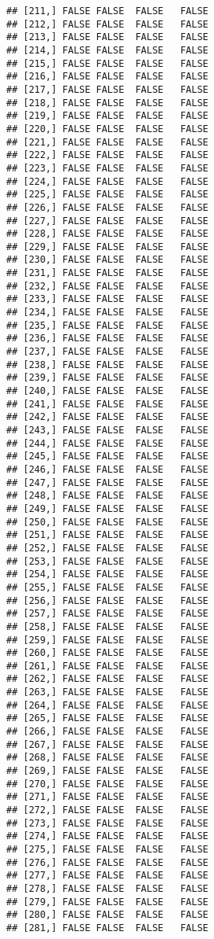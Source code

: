 \documentclass[
]{article}
\begin{document}
\begin{verbatim}
## [211,] FALSE FALSE  FALSE   FALSE
## [212,] FALSE FALSE  FALSE   FALSE
## [213,] FALSE FALSE  FALSE   FALSE
## [214,] FALSE FALSE  FALSE   FALSE
## [215,] FALSE FALSE  FALSE   FALSE
## [216,] FALSE FALSE  FALSE   FALSE
## [217,] FALSE FALSE  FALSE   FALSE
## [218,] FALSE FALSE  FALSE   FALSE
## [219,] FALSE FALSE  FALSE   FALSE
## [220,] FALSE FALSE  FALSE   FALSE
## [221,] FALSE FALSE  FALSE   FALSE
## [222,] FALSE FALSE  FALSE   FALSE
## [223,] FALSE FALSE  FALSE   FALSE
## [224,] FALSE FALSE  FALSE   FALSE
## [225,] FALSE FALSE  FALSE   FALSE
## [226,] FALSE FALSE  FALSE   FALSE
## [227,] FALSE FALSE  FALSE   FALSE
## [228,] FALSE FALSE  FALSE   FALSE
## [229,] FALSE FALSE  FALSE   FALSE
## [230,] FALSE FALSE  FALSE   FALSE
## [231,] FALSE FALSE  FALSE   FALSE
## [232,] FALSE FALSE  FALSE   FALSE
## [233,] FALSE FALSE  FALSE   FALSE
## [234,] FALSE FALSE  FALSE   FALSE
## [235,] FALSE FALSE  FALSE   FALSE
## [236,] FALSE FALSE  FALSE   FALSE
## [237,] FALSE FALSE  FALSE   FALSE
## [238,] FALSE FALSE  FALSE   FALSE
## [239,] FALSE FALSE  FALSE   FALSE
## [240,] FALSE FALSE  FALSE   FALSE
## [241,] FALSE FALSE  FALSE   FALSE
## [242,] FALSE FALSE  FALSE   FALSE
## [243,] FALSE FALSE  FALSE   FALSE
## [244,] FALSE FALSE  FALSE   FALSE
## [245,] FALSE FALSE  FALSE   FALSE
## [246,] FALSE FALSE  FALSE   FALSE
## [247,] FALSE FALSE  FALSE   FALSE
## [248,] FALSE FALSE  FALSE   FALSE
## [249,] FALSE FALSE  FALSE   FALSE
## [250,] FALSE FALSE  FALSE   FALSE
## [251,] FALSE FALSE  FALSE   FALSE
## [252,] FALSE FALSE  FALSE   FALSE
## [253,] FALSE FALSE  FALSE   FALSE
## [254,] FALSE FALSE  FALSE   FALSE
## [255,] FALSE FALSE  FALSE   FALSE
## [256,] FALSE FALSE  FALSE   FALSE
## [257,] FALSE FALSE  FALSE   FALSE
## [258,] FALSE FALSE  FALSE   FALSE
## [259,] FALSE FALSE  FALSE   FALSE
## [260,] FALSE FALSE  FALSE   FALSE
## [261,] FALSE FALSE  FALSE   FALSE
## [262,] FALSE FALSE  FALSE   FALSE
## [263,] FALSE FALSE  FALSE   FALSE
## [264,] FALSE FALSE  FALSE   FALSE
## [265,] FALSE FALSE  FALSE   FALSE
## [266,] FALSE FALSE  FALSE   FALSE
## [267,] FALSE FALSE  FALSE   FALSE
## [268,] FALSE FALSE  FALSE   FALSE
## [269,] FALSE FALSE  FALSE   FALSE
## [270,] FALSE FALSE  FALSE   FALSE
## [271,] FALSE FALSE  FALSE   FALSE
## [272,] FALSE FALSE  FALSE   FALSE
## [273,] FALSE FALSE  FALSE   FALSE
## [274,] FALSE FALSE  FALSE   FALSE
## [275,] FALSE FALSE  FALSE   FALSE
## [276,] FALSE FALSE  FALSE   FALSE
## [277,] FALSE FALSE  FALSE   FALSE
## [278,] FALSE FALSE  FALSE   FALSE
## [279,] FALSE FALSE  FALSE   FALSE
## [280,] FALSE FALSE  FALSE   FALSE
## [281,] FALSE FALSE  FALSE   FALSE

\end{verbatim}
\end{document}
